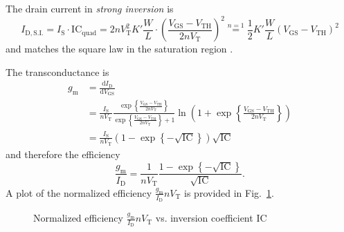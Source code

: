 \documentclass{article}[11pt]
\begin{document}
The drain current in \textit{strong inversion} is
\begin{equation}\label{eq:id-si}
  I_{\mathrm{D,S.I.}} = I_{\mathrm{S}} \cdot \mathrm{IC}_{\mathrm{quad}}
                      = 2 n V_{\mathrm{T}}^2 K' \frac{W}{L} \cdot \left(\frac{V_{\mathrm{GS}}-V_{\mathrm{TH}}}{2 n V_{\mathrm{T}}}\right)^2
                        \stackrel{n=1}{=} \frac{1}{2} K' \frac{W}{L} \left(V_{\mathrm{GS}}-V_{\mathrm{TH}}\right)^2
\end{equation}
and matches the square law in the saturation region 
\cite{mosfet-square-law}.

\bigskip

The transconductance is
\begin{equation}\label{eq:gm}
\begin{split}
 g_{\mathrm{m}}
 &= \frac{\mathrm{d} I_{\mathrm{D}}}{\mathrm{d} V_{\mathrm{GS}}} \\
 &= \frac{I_{\mathrm{S}}}{n V_{\mathrm{T}}} \frac{\exp\left\{\frac{V_{\mathrm{GS}}-V_{\mathrm{TH}}}{2 n V_{\mathrm{T}}}\right\}}{\exp\left\{\frac{V_{\mathrm{GS}}-V_{\mathrm{TH}}}{2 n V_{\mathrm{T}}}\right\}+1} \ln\left(1+\exp\left\{\frac{V_{\mathrm{GS}}-V_{\mathrm{TH}}}{2 n V_{\mathrm{T}}}\right\}\right)\\
 &= \frac{I_{\mathrm{S}}}{n V_{\mathrm{T}}} \left(1-\exp\left\{-\sqrt{\mathrm{IC}}\right\}\right) \sqrt{\mathrm{IC}}
\end{split}
\end{equation}
and therefore the efficiency
\begin{equation}\label{eq:gmid}
\frac{g_{\mathrm{m}}}{I_{\mathrm{D}}} = \frac{1}{n V_{\mathrm{T}}}  \frac{1-\exp\left\{-\sqrt{\mathrm{IC}}\right\}}{\sqrt{\mathrm{IC}}}.
\end{equation}
A plot of the normalized efficiency $\frac{g_{\mathrm{m}}}{I_{\mathrm{D}}} n V_{\mathrm{T}}$
is provided in Fig.~\ref{fig:plot2}.
\begin{figure}[ht]
  \centering
  \caption{Normalized efficiency 
    $\frac{g_{\mathrm{m}}}{I_{\mathrm{D}}} n V_{\mathrm{T}}$ vs. 
    inversion coefficient $\mathrm{IC}$}
  \label{fig:plot2}
\end{figure}
\end{document}
